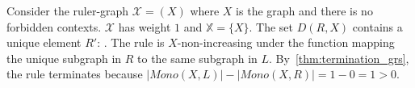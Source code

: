 \begin{example}
      Consider the ruler-graph $\mathcal{X} = (X)$ where $X$ is the graph
       and there is no forbidden contexts. $\mathcal{X}$ has weight $1$ and $\mathbb{X} = \{X\}$.
      The set \( D(R,X) \) contains a unique element $R'$:
      . The rule is $X$-non-increasing under the function mapping the unique subgraph in $R$ to the same subgraph in $L$. 
      By~\autoref{thm:termination_grs}, the rule terminates because \(|Mono(X,L)| - |Mono(X,R)| = 1 - 0 = 1 > 0 \). 
\end{example}
